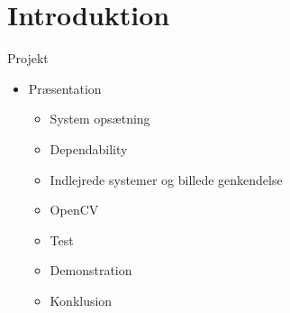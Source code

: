 \section{Introduktion}
\begin{frame}[fragile]{Projekt}
  
  \begin{itemize}
    \item Præsentation
    \begin{itemize}
	    \item System opsætning
	    \item Dependability
	    \item Indlejrede systemer og billede genkendelse
	    \item OpenCV
	    \item Test
	    \item Demonstration
	    \item Konklusion
    \end{itemize}
  \end{itemize}
\end{frame}